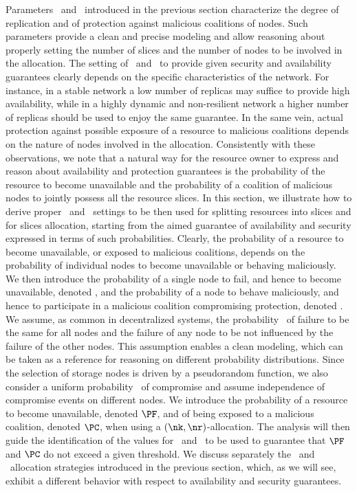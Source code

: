 {Parameters \nr\ and \nk\ introduced in the previous section
characterize the degree of replication and of protection against
malicious coalitions of nodes.  Such parameters provide a clean and
precise modeling and allow reasoning about properly setting the number
of slices and the number of nodes to be involved in the allocation.
The setting of \nk\ and \nr\ to provide given security and
availability guarantees clearly depends on the specific
characteristics of the network.  For instance, in a stable network a
low number of replicas may suffice to provide high availability, while
in a highly dynamic and non-resilient network a higher number of
replicas should be used to enjoy the same guarantee. In the same vein,
actual protection against possible exposure of a resource to malicious
coalitions depends on the nature of nodes involved in the allocation.
Consistently with these observations, we note that a natural way for
the resource owner to express and reason about availability and
protection guarantees is the probability of the resource to become
unavailable and the probability of a coalition of malicious nodes to
jointly possess all the resource slices.  In this section, we
illustrate how to derive proper \nr\ and \nk\ settings to be then used
for splitting resources into slices and for slices allocation,
starting from the aimed guarantee of availability and security
expressed in terms of such probabilities.  Clearly, the probability of
a resource to become unavailable, or exposed to malicious coalitions,
depends on the probability of individual nodes to become unavailable
or behaving maliciously.  We then introduce the probability of a
single node to fail, and hence to become unavailable, denoted \pf, and
the probability of a node to behave maliciously, and hence to
participate in a malicious coalition compromising protection, denoted
\pc.  We assume, as common in decentralized systems, the probability
\pf\ of failure to be the same for all nodes and the failure of any
node to be not influenced by the failure of the other nodes. This
assumption enables a clean modeling, which can be taken as a reference
for reasoning on different probability distributions. Since the
selection of storage nodes is driven by a pseudorandom function, we
also consider a uniform probability \pc\ of compromise and assume
independence of compromise events on different nodes.  We introduce
the probability of a resource to become unavailable, denoted $\PF$,
and of being exposed to a malicious coalition, denoted $\PC$, when
using a $(\nk,\nr)$-allocation.  The analysis will then guide the
identification of the values for \nk\ and \nr\ to be used to guarantee
that $\PF$ and $\PC$ do not exceed a given threshold.  We discuss
separately the \diagonal\ and \compact\ allocation strategies
introduced in the previous section, which, as we will see, exhibit a
different behavior with respect to availability and security
guarantees.

}
